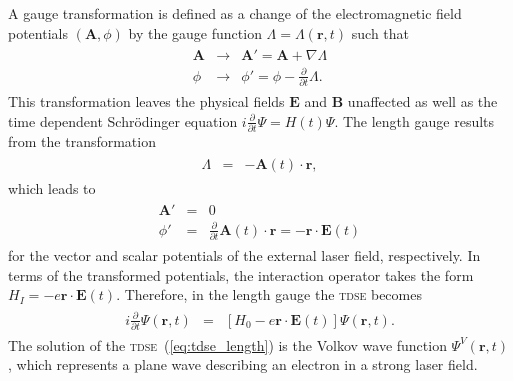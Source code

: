 A gauge transformation is defined as a change of the electromagnetic
field potentials $(\mathbf{A}, \phi)$ by the gauge function $\Lambda =
\Lambda(\mathbf{r},t)$ such that
%
\begin{eqnarray}
  \label{eq:gauge}
  \begin{split}
    \mathbf{A} & \to & \mathbf{A}' = \mathbf{A} + \nabla\Lambda \\
    \phi & \to & \phi' = \phi - \frac{\partial}{\partial t}\Lambda.
  \end{split}
\end{eqnarray}
%
This transformation leaves the physical fields $\mathbf{E}$ and
$\mathbf{B}$ unaffected as well as the time dependent Schr\"{o}dinger
equation $i\frac{\partial}{\partial t}\Psi = H(t)\Psi$. The length
gauge results from the transformation
%
\begin{eqnarray}
  \label{eq:length_gauge}
  \begin{split}
    \Lambda & = & -\mathbf{A}(t) \cdot \mathbf{r},
  \end{split}
\end{eqnarray}
%
which leads to
%
\begin{eqnarray}
  \label{eq:A_length}
  \begin{split}
    \mathbf{A}' & = & 0 \\
    \phi' & = & \frac{\partial}{\partial t}
    \mathbf{A}(t) \cdot \mathbf{r} = -\mathbf{r} \cdot \mathbf{E}(t) 
  \end{split}
\end{eqnarray}
for the vector and scalar potentials of the external laser field,
respectively. In terms of the transformed potentials, the interaction
operator takes the form $H_{I} = -e \mathbf{r} \cdot \mathbf{E}(t)$.
Therefore, in the length gauge the \textsc{tdse} becomes
%
\begin{eqnarray}
  \label{eq:tdse_length}
  \begin{split}
    i \frac{\partial}{\partial t} \Psi(\mathbf{r}, t) & = & \left[H_{0} -
      e\mathbf{r}\cdot\mathbf{E}(t) \right] \Psi(\mathbf{r}, t).
  \end{split}
\end{eqnarray}
%
The solution of the \textsc{tdse}~(\ref{eq:tdse_length}) is the Volkov
wave function $\Psi^{V}(\mathbf{r}, t)$, which represents a plane wave
describing an electron in a strong laser field.

